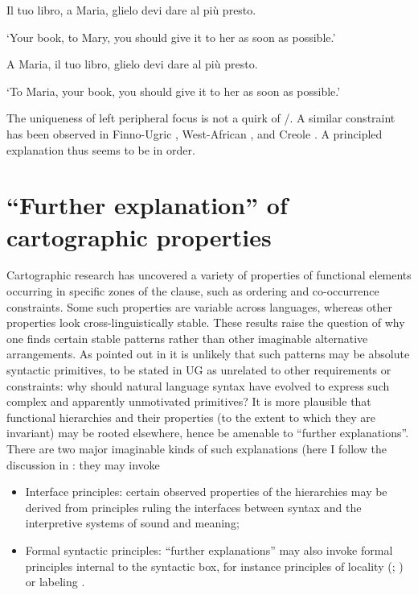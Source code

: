 \documentclass[output=paper]{LSP/langsci}
\begin{document}
\ea%
    \label{ex:3}
\ea   Il tuo libro, a Maria, glielo devi dare al più presto.

\glt ‘Your book, to Mary, you should give it to her as soon as possible.’

\ex  A Maria, il tuo libro, glielo devi dare al più presto.

\glt ‘To Maria, your book, you should give it to her as soon as possible.’
\z
\z

The uniqueness of left peripheral focus is not a quirk of /. A similar constraint has been observed in Finno-Ugric \citep{Puskás2000}, West-African \citep{Hager2014}, and  Creole \citep{Durrlemann2008}. A principled explanation thus seems to be in order.

\section{“Further explanation” of cartographic properties}%

Cartographic research has uncovered a variety of properties of functional elements occurring in specific zones of the clause, such as ordering and co-occurrence constraints. Some such properties are variable across languages, whereas other properties look cross-linguistically stable. These results raise the question of why one finds certain stable patterns rather than other imaginable alternative arrangements.  As pointed out in  \citet{CinqueRizzi2010} it is unlikely that such patterns may be absolute syntactic primitives, to be stated in UG as unrelated to other requirements or constraints: why should natural language syntax have evolved to express such complex and apparently unmotivated primitives? It is more plausible that functional hierarchies and their properties (to the extent to which they are invariant) may be rooted elsewhere, hence be amenable to “further explanations”.  There are two major imaginable kinds of such explanations (here I follow the discussion in \citet{Rizzi2013}: they may invoke

\begin{itemize}
\item Interface principles: certain observed properties of the hierarchies may be derived from principles ruling the interfaces between syntax and the interpretive systems of sound and meaning; 
\item Formal syntactic principles: “further explanations” may also invoke formal principles internal to the syntactic box, for instance principles of locality (\citealt{Abels2012}; \citealt{Haegeman2012b}) or labeling \citep{Rizzi2016}. 
\end{itemize}
\end{document}
